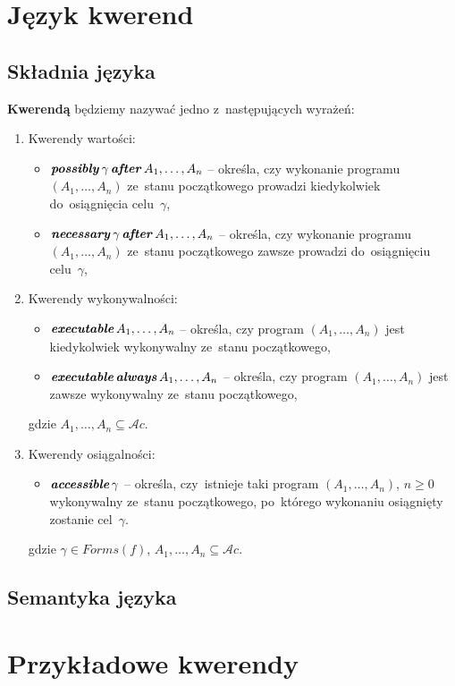 \documentclass[11pt,a4paper]{article}
\DeclareMathOperator{\After}{\textbf{\textit{after}}}
\DeclareMathOperator{\Always}{\textbf{\textit{always}}}
\DeclareMathOperator{\Executable}{\textbf{\textit{executable}}}
\DeclareMathOperator{\Accessible}{\textbf{\textit{accessible}}}
\DeclareMathOperator{\Possibly}{\textbf{\textit{possibly}}}
\DeclareMathOperator{\Necessary}{\textbf{\textit{necessary}}}
\begin{document}
\section{Język kwerend}

\subsection{Składnia języka}

    \textbf{Kwerendą} będziemy nazywać jedno z~następujących wyrażeń:

    \begin{enumerate}
        \item Kwerendy wartości:
        \begin{itemize}            
            \item $\Possibly \gamma \After A_1, \dots, A_n$ -- określa, czy wykonanie programu $(A_1, \dots, A_n)$ ze~stanu początkowego prowadzi kiedykolwiek do~osiągnięcia celu~$\gamma$,
            \item $\Necessary \gamma \After A_1, \dots, A_n$ -- określa, czy wykonanie programu $(A_1, \dots, A_n)$ ze~stanu początkowego zawsze prowadzi do~osiągnięciu celu~$\gamma$,
        \end{itemize}
        \item Kwerendy wykonywalności:
        \begin{itemize}
            \item $\Executable A_1, \dots, A_n$ -- określa, czy program $(A_1, \dots, A_n)$ jest kiedykolwiek wykonywalny ze~stanu początkowego,
            \item $\Executable \Always A_1, \dots, A_n$ -- określa, czy program $(A_1, \dots, A_n)$ jest zawsze wykonywalny ze~stanu początkowego,
        \end{itemize}
        gdzie $A_1, \dots, A_n \subseteq \mathcal{A}c$.
        \item Kwerendy osiągalności:
        \begin{itemize}
            \item $\Accessible \gamma$ -- określa, czy~istnieje taki program $(A_1, \dots, A_n)$, $n \geq 0$ wykonywalny ze~stanu początkowego, po~którego wykonaniu osiągnięty zostanie cel~$\gamma$.
        \end{itemize}
        gdzie $\gamma \in Forms(f)$, $A_1, \dots, A_n \subseteq \mathcal{A}c$.
    \end{enumerate}


\subsection{Semantyka języka}


\section{Przykładowe kwerendy}

\end{document}
